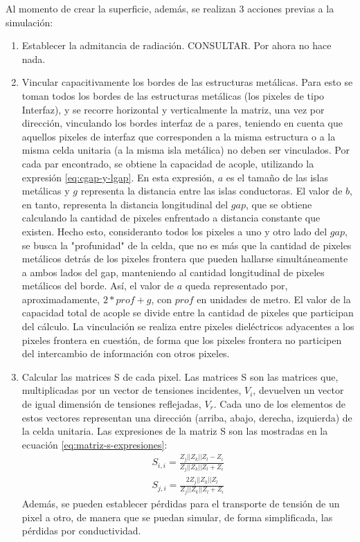 Al momento de crear la superficie, además, se realizan 3 acciones previas a la simulación:
\begin{enumerate}
	\item Establecer la admitancia de radiación. CONSULTAR. Por ahora no hace nada.
	\item Vincular capacitivamente los bordes de las estructuras metálicas. Para esto se toman todos los bordes de las estructuras metálicas (los pixeles de tipo Interfaz), y se recorre horizontal y verticalmente la matriz, una vez por dirección, vinculando los bordes interfaz de a pares, teniendo en cuenta que aquellos pixeles de interfaz que corresponden a la misma estructura o a la misma celda unitaria (a la misma isla metálica) no deben ser vinculados. Por cada par encontrado, se obtiene la capacidad de acople, utilizando la expresión \ref{eq:cgap-y-lgap}. En esta expresión, $a$ es el tamaño de las islas metálicas y $g$ representa la distancia entre las islas conductoras. El valor de $b$, en tanto, representa la distancia longitudinal del $gap$, que se obtiene calculando la cantidad de pixeles enfrentado a distancia constante que existen. Hecho esto, consideranto todos los pixeles a uno y otro lado del $gap$, se busca la "profunidad" de la celda, que no es más que la cantidad de pixeles metálicos detrás de los pixeles frontera que pueden hallarse simultáneamente a ambos lados del gap, manteniendo al cantidad longitudinal de pixeles metálicos del borde. Así, el valor de $a$ queda representado por, aproximadamente, $2*prof+g$, con $prof$ en unidades de metro. El valor de la capacidad total de acople se divide entre la cantidad de pixeles que participan del cálculo. La vinculación se realiza entre pixeles dieléctricos adyacentes a los pixeles frontera en cuestión, de forma que los pixeles frontera no participen del intercambio de información con otros pixeles.
	\item Calcular las matrices S de cada pixel. Las matrices S son las matrices que, multiplicadas por un vector de tensiones incidentes, $V_i$, devuelven un vector de igual dimensión de tensiones reflejadas, $V_r$. Cada uno de los elementos de estos vectores representan una dirección (arriba, abajo, derecha, izquierda) de la celda unitaria. Las expresiones de la matriz S son las mostradas en la ecuación \ref{eq:matriz-s-expresiones}:
	\begin{subequations}
		\label{eq:matriz-s-expresiones}
		\begin{align}
			S_{i,i} = \frac{Z_{j}||Z_{k}||Z_{l} -Z_{i}}{Z_{j}||Z_{k}||Z_{l} +Z_{i}} \\
			S_{j,i} = \frac{2 Z_{j}||Z_{k}||Z_{l}}{Z_{j}||Z_{k}||Z_{l} +Z_{i}}
		\end{align}
	\end{subequations}
	Además, se pueden establecer pérdidas para el transporte de tensión de un pixel a otro, de manera que se puedan simular, de forma simplificada, las pérdidas por conductividad.
	

\end{enumerate}

